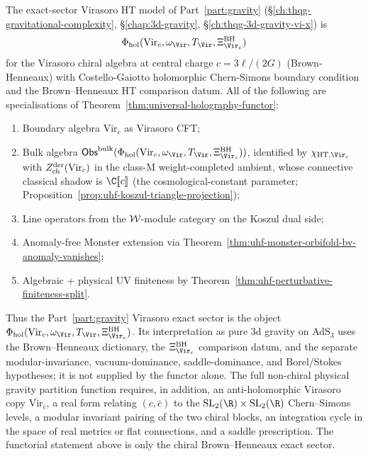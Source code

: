 \begin{corollary}
\label{cor:uhf-universal-holography-is-a-theorem}
The exact-sector Virasoro HT model of Part~\ref*{part:gravity}
\textup{(}\S\ref*{ch:thqg-gravitational-complexity},
\S\ref*{chap:3d-gravity},
\S\ref*{ch:thqg-3d-gravity-vi-x}\textup{)} is
\[
\Phi_{\mathrm{hol}}(
\mathrm{Vir}_c,\omega_{\Vir},T_{\Vir},
\Xi_{\Vir_c}^{\mathrm{BH}})
\]
for the Virasoro chiral algebra at central charge
$c = 3\ell / (2G)$
\textup{(}Brown-Henneaux\textup{)} with Costello-Gaiotto
holomorphic Chern-Simons boundary condition and the
Brown--Henneaux HT comparison datum. All of the following are
specialisations of Theorem~\ref{thm:universal-holography-functor}:
\begin{enumerate}[label=\textup{(\roman*)}]
\item Boundary algebra $\mathrm{Vir}_c$ as Virasoro CFT;
\item Bulk algebra
 \(\Obs^{\mathrm{bulk}}(
 \Phi_{\mathrm{hol}}(\mathrm{Vir}_c,\omega_{\Vir},T_{\Vir},
 \Xi_{\Vir_c}^{\mathrm{BH}}))\), identified by
 \(\chi_{\mathrm{HT},\Vir_c}\) with
 $Z^{\mathrm{der}}_{\mathrm{ch}}(\mathrm{Vir}_c)$ in the class-M weight-completed ambient,
 whose connective classical shadow is
 $\C[\![c]\!]$ \textup{(}the cosmological-constant parameter;
 Proposition~\ref{prop:uhf-koszul-triangle-projection}\textup{)};
\item Line operators from the $\mathcal{W}$-module category on the Koszul
 dual side;
\item Anomaly-free Monster extension via
 Theorem~\ref{thm:uhf-monster-orbifold-bv-anomaly-vanishes};
\item Algebraic + physical UV finiteness by
 Theorem~\ref{thm:uhf-perturbative-finiteness-split}.
\end{enumerate}
Thus the Part~\ref*{part:gravity} Virasoro exact sector is the object
\(\Phi_{\mathrm{hol}}(
\mathrm{Vir}_c,\omega_{\Vir},T_{\Vir},
\Xi_{\Vir_c}^{\mathrm{BH}})\). Its interpretation as pure
3d gravity on AdS$_3$ uses the Brown--Henneaux dictionary, the
\(\Xi_{\Vir_c}^{\mathrm{BH}}\) comparison datum, and the
separate modular-invariance, vacuum-dominance, saddle-dominance, and
Borel/Stokes hypotheses; it is not supplied by the functor alone.
The full non-chiral physical gravity partition function requires, in
addition, an anti-holomorphic Virasoro copy
\(\overline{\mathrm{Vir}}_{\bar c}\), a real form relating
\((c,\bar c)\) to the \(\mathrm{SL}_2(\R)\times\mathrm{SL}_2(\R)\)
Chern--Simons levels, a modular invariant pairing of the two chiral
blocks, an integration cycle in the space of real metrics or flat
connections, and a saddle prescription.  The functorial statement
above is only the chiral Brown--Henneaux exact sector.
\end{corollary}

